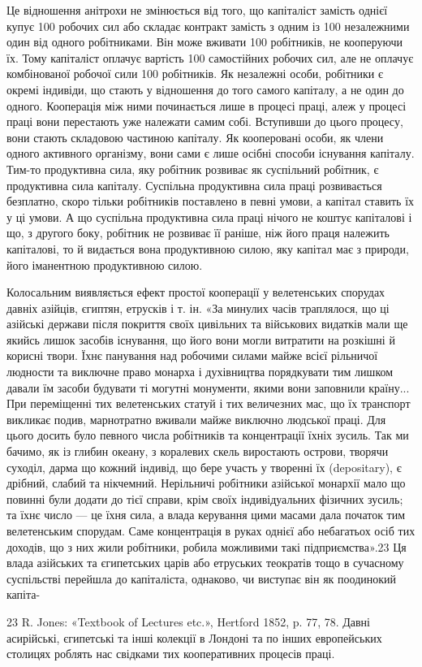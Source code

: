 Це відношення анітрохи не змінюється від того, що капіталіст
замість однієї купує 100 робочих сил або складає контракт замість
з одним із 100 незалежними один від одного робітниками. Він може
вживати 100 робітників, не кооперуючи їх. Тому капіталіст
оплачує вартість 100 самостійних робочих сил, але не оплачує
комбінованої робочої сили 100 робітників. Як незалежні особи,
робітники є окремі індивіди, що стають у відношення до того
самого капіталу, а не один до одного. Кооперація між ними починається
лише в процесі праці, алеж у процесі праці вони перестають
уже належати самим собі. Вступивши до цього процесу,
вони стають складовою частиною капіталу. Як кооперовані
особи, як члени одного активного організму, вони сами є лише
осібні способи існування капіталу. Тим-то продуктивна сила,
яку робітник розвиває як суспільний робітник, є продуктивна
сила капіталу. Суспільна продуктивна сила праці розвивається
безплатно, скоро тільки робітників поставлено в певні умови,
а капітал ставить їх у ці умови. А що суспільна продуктивна
сила праці нічого не коштує капіталові і що, з другого боку, робітник
не розвиває її раніше, ніж його праця належить капіталові,
то й видається вона продуктивною силою, яку капітал має з
природи, його іманентною продуктивною силою.

Колосальним виявляється ефект простої кооперації у велетенських
спорудах давніх азійців, єгиптян, етрусків і т. ін.
«За минулих часів траплялося, що ці азійські держави після
покриття своїх цивільних та військових видатків мали ще якийсь
лишок засобів існування, що його вони могли витратити на розкішні
й корисні твори. Їхнє панування над робочими силами майже
всієї рільничої людности та виключне право монарха і духівництва
порядкувати тим лишком давали їм засоби будувати ті
могутні монументи, якими вони заповнили країну... При переміщенні
тих велетенських статуй і тих величезних мас, що їх
транспорт викликає подив, марнотратно вживали майже виключно
людської праці. Для цього досить було певного числа робітників
та концентрації їхніх зусиль. Так ми бачимо, як із глибин океану,
з коралевих скель виростають острови, творячи суходіл, дарма
що кожний індивід, що бере участь у творенні їх (depositary),
є дрібний, слабий та нікчемний. Нерільничі робітники азійської
монархії мало що повинні були додати до тієї справи, крім
своїх індивідуальних фізичних зусиль; та їхнє число — це їхня
сила, а влада керування цими масами дала початок тим велетенським
спорудам. Саме концентрація в руках однієї або небагатьох
осіб тих доходів, що з них жили робітники, робила можливими
такі підприємства».23 Ця влада азійських та єгипетських царів
або етруських теократів тощо в сучасному суспільстві перейшла
до капіталіста, однаково, чи виступає він як поодинокий капіта-

23 R. Jones: «Textbook of Lectures etc.», Hertford 1852, p. 77, 78.
Давні асирійські, єгипетські та інші колекції в Лондоні та по інших
европейських столицях роблять нас свідками тих кооперативних процесів
праці.
